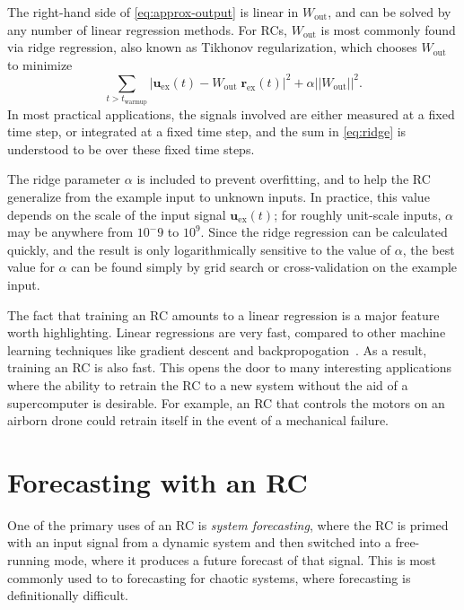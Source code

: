 The right-hand side of \cref{eq:approx-output} is linear in
$W_\text{out}$, and can be solved by any number of linear regression
methods. For RCs, $W_\text{out}$ is most commonly found via ridge
regression, also known as Tikhonov regularization, which chooses
$W_\text{out}$ to minimize
\begin{equation}
  \label{eq:ridge}
  \sum_{t>t_\text{warmup}} |\mathbf{u}_\text{ex}(t) - W_\text{out}\;\mathbf{r}_\text{ex}(t)|^2 + \alpha ||W_\text{out}||^2.
\end{equation}
In most practical applications, the signals involved are either
measured at a fixed time step, or integrated at a fixed time step, and
the sum in \cref{eq:ridge} is understood to be over these fixed time
steps.

The ridge parameter $\alpha$ is included to prevent overfitting, and
to help the RC generalize from the example input to unknown inputs. In
practice, this value depends on the scale of the input signal
$\bm{u}_\text{ex}(t)$; for roughly unit-scale inputs, $\alpha$ may be
anywhere from $10^-{9}$ to $10^9$. Since the ridge regression can be
calculated quickly, and the result is only logarithmically sensitive
to the value of $\alpha$, the best value for $\alpha$ can be found
simply by grid search or cross-validation on the example input.

The fact that training an RC amounts to a linear regression is a major
feature worth highlighting. Linear regressions are very fast, compared
to other machine learning techniques like gradient descent and
backpropogation~\cite{lukosevicius2009}. As a result, training an RC
is also fast. This opens the door to many interesting applications
where the ability to retrain the RC to a new system without the aid of
a supercomputer is desirable. For example, an RC that controls the
motors on an airborn drone could retrain itself in the event of a
mechanical failure.

\section{Forecasting with an RC}

One of the primary uses of an RC is \emph{system forecasting}, where
the RC is primed with an input signal from a dynamic system and then
switched into a free-running mode, where it produces a future forecast
of that signal. This is most commonly used to to forecasting for
chaotic systems, where forecasting is definitionally difficult.

